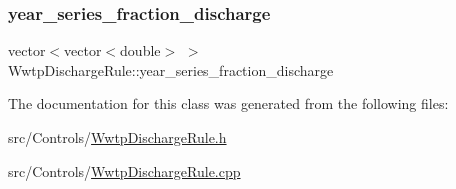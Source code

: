 \mbox{\label{classWwtpDischargeRule_a5d193e0cbc2eb23e1b86e79fb2eafad3}} 
\subsubsection{\texorpdfstring{year\+\_\+series\+\_\+fraction\+\_\+discharge}{year\_series\_fraction\_discharge}}
{\footnotesize\ttfamily vector$<$vector$<$double$>$ $>$ Wwtp\+Discharge\+Rule\+::year\+\_\+series\+\_\+fraction\+\_\+discharge}



The documentation for this class was generated from the following files\+:\begin{DoxyCompactItemize}
\item 
src/\+Controls/\mbox{\hyperlink{WwtpDischargeRule_8h}{Wwtp\+Discharge\+Rule.\+h}}\item 
src/\+Controls/\mbox{\hyperlink{WwtpDischargeRule_8cpp}{Wwtp\+Discharge\+Rule.\+cpp}}\end{DoxyCompactItemize}
